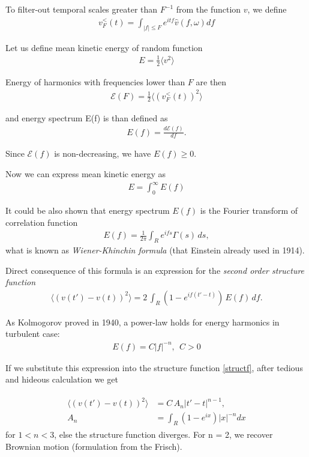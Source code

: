 To filter-out temporal scales greater than $F^{-1}$ from the function $v$, we define
\begin{align}
v_F^{<}(t) = \int_{|f| \leq F} e^{itf} \hat{v}(f,\omega) df
\end{align} 

\bigskip

Let us define mean kinetic energy of random function 
\begin{align}
E = \frac{1}{2} \langle v^2 \rangle
\end{align}

Energy of harmonics with frequencies lower than $F$ are then
\begin{align}
\mathcal{E}(F) = \frac{1}{2} \langle (v_F^{<}(t))^2 \rangle
\end{align}

and energy spectrum E(f) is than defined as
\begin{align}
E(f) = \frac{d\mathcal{E}(f)}{df}.
\end{align}

Since $\mathcal{E}(f)$ is non-decreasing, we have $E(f) \geq 0$.

\bigskip

Now we can express mean kinetic energy as
\begin{align}
E = \int_0^{\infty} E(f)
\end{align}

It could be also shown that energy spectrum $E(f)$ is the Fourier transform of correlation function
\begin{align} 
E(f)  = \frac{1}{2\pi} \int_{R} e^{ifs} \Gamma(s) \,ds,
\end{align}
what is known as \textit{Wiener-Khinchin formula} (that Einstein already used in 1914).

Direct consequence of this formula is an expression for the \textit{second order structure function}
\begin{align}\label{structf}
\langle (v(t') - v(t))^2 \rangle = 2 \, \int_{R} (1 - e^{if(t' - t)}) \, E(f) \, df.
\end{align}

\bigskip

As Kolmogorov proved in 1940, a power-law holds for energy harmonics in turbulent case:
\begin{align}
E(f) = C |f|^{-n}, ~~ C>0
\end{align}

If we substitute this expression into the structure function \ref{structf}, after tedious and hideous calculation we get

\begin{align} \label{Brown}
\begin{split}
\langle (v(t') - v(t))^2 \rangle &= C\,A_n |t' - t|^{n-1}, \\
A_n &= \int_R (1-e^{ix}) |x|^{-n} dx
\end{split}
\end{align}
for $1 < n < 3$, else the structure function diverges. For n = 2, we recover Brownian motion (formulation from the Frisch).



